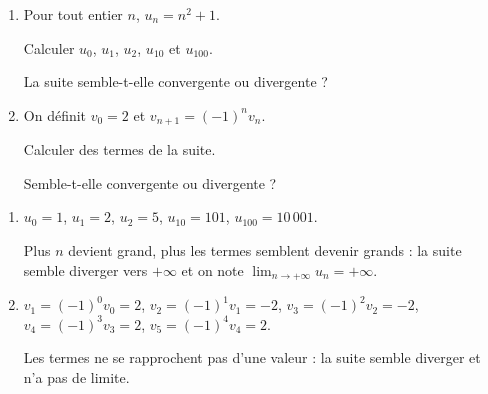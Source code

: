 \begin{methode}
	\nline
	\begin{enumerate}
		\item Pour tout entier $n$, $u_n = n^2 + 1$.

		      Calculer $u_0$, $u_1$, $u_2$, $u_{10}$ et $u_{100}$.

		      La suite semble-t-elle convergente ou divergente ?
		\item On définit $v_0 = 2$ et $v_{n+1} = (-1)^n v_n$.

		      Calculer des termes de la suite.

		      Semble-t-elle convergente ou divergente ?
	\end{enumerate}
	\newpage

	\begin{correction}
		\nline
		\begin{enumerate}
			\item $u_0 = 1$, $u_1 = 2$, $u_2 = 5$, $u_{10} = 101$, $u_{100} = 10\,001$.

			      Plus $n$ devient grand, plus les termes semblent devenir grands : la suite semble diverger vers $+\infty$ et on note $\displaystyle\lim_{n \to +\infty} u_n = +\infty$.
			\item $v_1 = (-1)^0 v_0 = 2$, $v_2 = (-1)^1 v_1 = -2$, $v_3 = (-1)^2 v_2 = -2$, $v_4 = (-1)^3 v_3 = 2$, $v_5 = (-1)^4 v_4 = 2$.

			      Les termes ne se rapprochent pas d'une valeur : la suite semble diverger et n'a pas de limite.
		\end{enumerate}
	\end{correction}
\end{methode}

